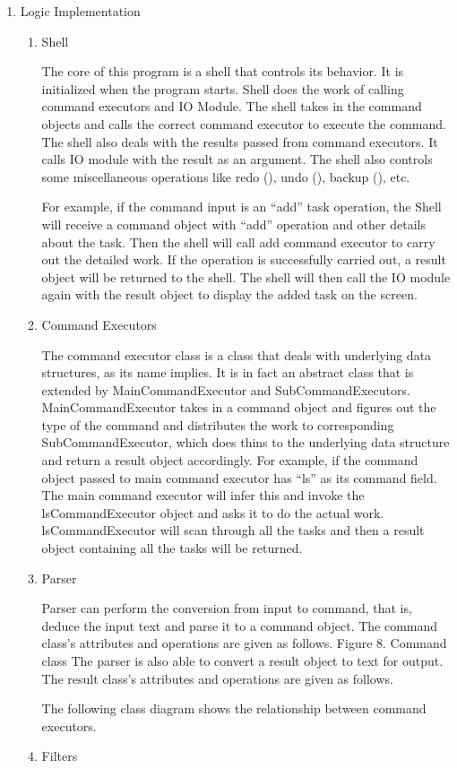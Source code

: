 \documentclass[12pt, a4paper]{article}
\begin{document}
\begin{enumerate}
\item Logic Implementation
\begin{enumerate}
\item Shell

The core of this program is a shell that controls its behavior. It is initialized when the
program starts. Shell does the work of calling command executors and IO Module. The
shell takes in the command objects and calls the correct command executor to execute
the command. The shell also deals with the results passed from command executors. It
calls IO module with the result as an argument. The shell also controls some
miscellaneous operations like redo (), undo (), backup (), etc.

For example, if the command input is an ``add'' task operation, the Shell will receive a
command object with ``add'' operation and other details about the task. Then the shell
will call add command executor to carry out the detailed work. If the operation is
successfully carried out, a result object will be returned to the shell. The shell will then
call the IO module again with the result object to display the added task on the screen.
\item Command Executors

The command executor class is a class that deals with underlying data structures, as its
name implies. It is in fact an abstract class that is extended by MainCommandExecutor
and SubCommandExecutors. MainCommandExecutor takes in a command object and
figures out the type of the command and distributes the work to corresponding
SubCommandExecutor, which does thins to the underlying data structure and return a
result object accordingly.
For example, if the command object passed to main command executor has ``ls'' as its
command field. The main command executor will infer this and invoke the
lsCommandExecutor object and asks it to do the actual work. lsCommandExecutor will
scan through all the tasks and then a result object containing all the tasks will be
returned.
\item Parser

Parser can perform the conversion from input to command, that is, deduce the input text
and parse it to a command object. The command class’s attributes and operations are
given as follows.
Figure 8. Command class
The parser is also able to convert a result object to text for output. The result class’s
attributes and operations are given as follows.

The following class diagram shows the relationship between command executors.
\item Filters


\end{enumerate}
\end{enumerate}
\end{document}
